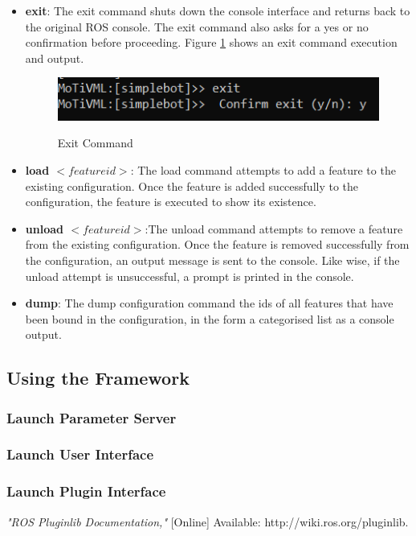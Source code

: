 \documentclass{article}
\begin{document}
\begin{itemize}
	\item \textbf{exit}: The exit command shuts down the console interface and returns back to the original ROS console. The exit command also asks for a yes or no confirmation before proceeding. Figure \ref{exit} shows an exit command execution and output.
	\begin{figure}[H]
		\caption{Exit Command}
		\centering
		\includegraphics[width=\columnwidth]{images/exit.png}
		\label{exit}
	\end{figure}

	\item \textbf{load $<feature id>$}: The load command attempts to add a feature to the existing configuration. Once the feature is added successfully to the configuration, the feature is executed to show its existence.
	
	\item \textbf{unload $<feature id>$}:The unload command attempts to remove a feature from the existing configuration. Once the feature is removed successfully from the configuration, an output message is sent to the console. Like wise, if the unload attempt is unsuccessful, a prompt is printed in the console. 
	
	\item \textbf{dump}: The dump configuration command the ids of all features that have been bound in the configuration, in the form a categorised list as a console output.
\end{itemize}

\subsection{Using the Framework}
\subsubsection{Launch Parameter Server}
\subsubsection{Launch User Interface}
\subsubsection{Launch Plugin Interface}

\begin{thebibliography}{9}
	\textit{"ROS Pluginlib Documentation,"} 
	[Online] Available: http://wiki.ros.org/pluginlib.
\end{thebibliography}
\end{document}
